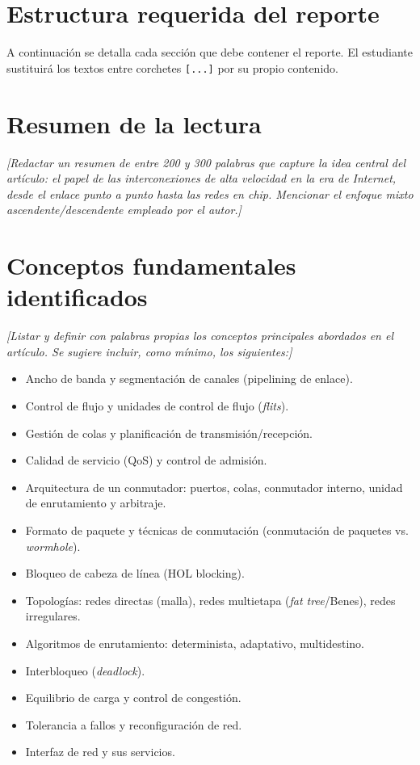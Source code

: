 \documentclass[12pt,a4paper]{article}
\begin{document}
\newpage

\section*{Estructura requerida del reporte}
A continuación se detalla cada sección que debe contener el reporte. El estudiante sustituirá los textos entre corchetes \texttt{[...]} por su propio contenido.

\section{Resumen de la lectura}
\textit{[Redactar un resumen de entre 200 y 300 palabras que capture la idea central del artículo: el papel de las interconexiones de alta velocidad en la era de Internet, desde el enlace punto a punto hasta las redes en chip. Mencionar el enfoque mixto ascendente/descendente empleado por el autor.]}

\section{Conceptos fundamentales identificados}
\textit{[Listar y definir con palabras propias los conceptos principales abordados en el artículo. Se sugiere incluir, como mínimo, los siguientes:]}
\begin{itemize}
    \item Ancho de banda y segmentación de canales (pipelining de enlace).
    \item Control de flujo y unidades de control de flujo (\textit{flits}).
    \item Gestión de colas y planificación de transmisión/recepción.
    \item Calidad de servicio (QoS) y control de admisión.
    \item Arquitectura de un conmutador: puertos, colas, conmutador interno, unidad de enrutamiento y arbitraje.
    \item Formato de paquete y técnicas de conmutación (conmutación de paquetes vs. \textit{wormhole}).
    \item Bloqueo de cabeza de línea (HOL blocking).
    \item Topologías: redes directas (malla), redes multietapa (\textit{fat tree}/Benes), redes irregulares.
    \item Algoritmos de enrutamiento: determinista, adaptativo, multidestino.
    \item Interbloqueo (\textit{deadlock}).
    \item Equilibrio de carga y control de congestión.
    \item Tolerancia a fallos y reconfiguración de red.
    \item Interfaz de red y sus servicios.
\end{itemize}
\end{document}
